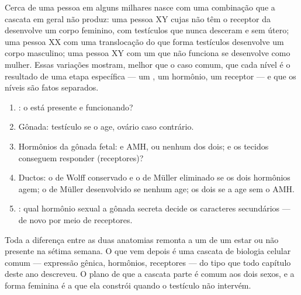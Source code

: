 \begin{example}\label{ex:g11:becoming-male-female:disagree}
Cerca de uma pessoa em alguns milhares nasce com uma combinação que a
cascata em geral não produz: uma pessoa XY cujas  não têm o
receptor da  desenvolve um corpo feminino, com testículos
que nunca desceram e sem útero; uma pessoa XX com uma translocação do
 que forma testículos desenvolve um corpo masculino; uma pessoa XY
com um  que não funciona se desenvolve como mulher. Essas variações
mostram, melhor que o caso comum, que cada nível é o resultado de uma
etapa específica --- um , um hormônio, um receptor --- e que os
níveis são fatos separados.
\end{example}

\begin{method}\label{met:g11:becoming-male-female:case}
\begin{enumerate}
  \item {}: o  está presente e funcionando?
  \item Gônada: testículo se o  age, ovário caso contrário.
  \item Hormônios da gônada fetal:  e AMH, ou nenhum dos
        dois; e os tecidos conseguem responder (receptores)?
  \item Ductos: o de Wolff conservado e o de Müller eliminado se os
        dois hormônios agem; o de Müller desenvolvido se nenhum age;
        os dois se a  age sem o AMH.
  \item {}: qual hormônio sexual a gônada secreta decide os
        caracteres secundários --- de novo por meio de receptores.
\end{enumerate}
\end{method}

\begin{remark}\label{rem:g11:becoming-male-female:onegene}
Toda a diferença entre as duas anatomias remonta a um  de um
 estar ou não presente na sétima semana. O que vem depois é
uma cascata de biologia celular comum --- expressão gênica, hormônios,
receptores --- do tipo que todo capítulo deste ano descreveu. O plano
de que a cascata parte é comum aos dois sexos, e a forma feminina é a
que ela constrói quando o testículo não intervém.
\end{remark}

